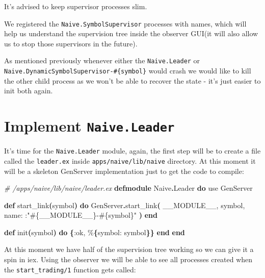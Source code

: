 \documentclass[
  oneside]{book}
\newenvironment{Shaded}{\begin{snugshade}}{\end{snugshade}}
\newcommand{\CommentTok}[1]{\textcolor[rgb]{0.56,0.35,0.01}{\textit{#1}}}
\newcommand{\ConstantTok}[1]{\textcolor[rgb]{0.56,0.35,0.01}{#1}}
\newcommand{\FunctionTok}[1]{\textcolor[rgb]{0.13,0.29,0.53}{\textbf{#1}}}
\newcommand{\ImportTok}[1]{#1}
\newcommand{\KeywordTok}[1]{\textcolor[rgb]{0.13,0.29,0.53}{\textbf{#1}}}
\newcommand{\NormalTok}[1]{#1}
\newcommand{\OperatorTok}[1]{\textcolor[rgb]{0.81,0.36,0.00}{\textbf{#1}}}
\newcommand{\OtherTok}[1]{\textcolor[rgb]{0.56,0.35,0.01}{#1}}
\newcommand{\StringTok}[1]{\textcolor[rgb]{0.31,0.60,0.02}{#1}}
\newcommand{\VariableTok}[1]{\textcolor[rgb]{0.00,0.00,0.00}{#1}}
\begin{document}
It's advised to keep supervisor processes slim.

We registered the \texttt{Naive.SymbolSupervisor} processes with names, which will help us understand the supervision tree inside the observer GUI(it will also allow us to stop those supervisors in the future).

\newpage

As mentioned previously whenever either the \texttt{Naive.Leader} or \texttt{Naive.DynamicSymbolSupervisor-\#\{symbol\}} would crash we would like to kill the other child process as we won't be able to recover the state - it's just easier to init both again.

\section{\texorpdfstring{Implement \texttt{Naive.Leader}}{Implement Naive.Leader}}\label{implement-naive.leader}

It's time for the \texttt{Naive.Leader} module, again, the first step will be to create a file called the \texttt{leader.ex} inside \texttt{apps/naive/lib/naive} directory. At this moment it will be a skeleton GenServer implementation just to get the code to compile:

\begin{Shaded}
\begin{Highlighting}[]
\CommentTok{\# /apps/naive/lib/naive/leader.ex}
\KeywordTok{defmodule} \ConstantTok{Naive}\OperatorTok{.}\ConstantTok{Leader} \KeywordTok{do}
  \ImportTok{use} \ConstantTok{GenServer}

  \KeywordTok{def}\NormalTok{ start\_link}\FunctionTok{(}\NormalTok{symbol}\FunctionTok{)} \KeywordTok{do}
    \ConstantTok{GenServer}\OperatorTok{.}\NormalTok{start\_link}\FunctionTok{(}
      \ConstantTok{\_\_MODULE\_\_}\NormalTok{,}
\NormalTok{      symbol,}
      \VariableTok{name:}\NormalTok{ :}\StringTok{"}\OtherTok{\#\{}\ConstantTok{\_\_MODULE\_\_}\OtherTok{\}}\StringTok{{-}}\OtherTok{\#\{}\NormalTok{symbol}\OtherTok{\}}\StringTok{"}
    \FunctionTok{)}
  \KeywordTok{end}

  \KeywordTok{def}\NormalTok{ init}\FunctionTok{(}\NormalTok{symbol}\FunctionTok{)} \KeywordTok{do}
    \FunctionTok{\{}\VariableTok{:ok}\NormalTok{, \%}\FunctionTok{\{}\VariableTok{symbol:}\NormalTok{ symbol}\FunctionTok{\}\}}
  \KeywordTok{end}
\KeywordTok{end}
\end{Highlighting}
\end{Shaded}

At this moment we have half of the supervision tree working so we can give it
a spin in iex. Using the observer we will be able to see all processes created when the \texttt{start\_trading/1} function gets called:
\end{document}
